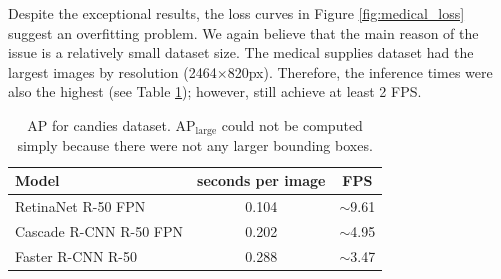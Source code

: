 Despite the exceptional results, the loss curves in Figure
\ref{fig:medical_loss} suggest an overfitting problem. We again believe that
the main reason of the issue is a relatively small dataset size. The medical
supplies dataset had the largest images by resolution (2464$\times$820px).
Therefore, the inference times were also the highest (see Table
\ref{tab:medical_times}); however, still achieve at least 2 FPS.

\begin{table}[H]
	\centering
	\begin{tabular}{l|c|c}
		Model                  & seconds per image & FPS                               \\
		\hline
		RetinaNet R-50 FPN     & 0.104             & \scriptsize $\sim$\normalsize9.61 \\
		Cascade R-CNN R-50 FPN & 0.202             & \scriptsize $\sim$\normalsize4.95 \\
		Faster R-CNN R-50      & 0.288             & \scriptsize $\sim$\normalsize3.47 \\
	\end{tabular}
	\caption{AP for candies dataset. AP$_\text{large}$ could not be computed
		simply because there were not any larger bounding boxes.}
	\label{tab:medical_times}
\end{table}

